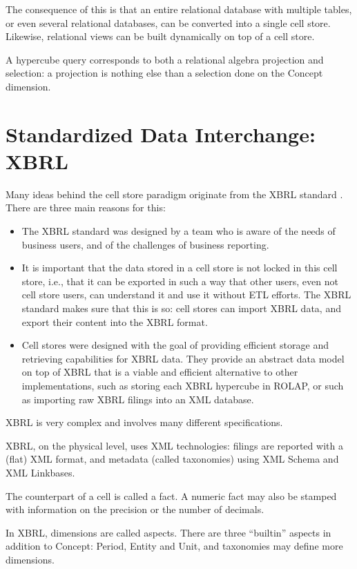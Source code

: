 \documentclass{vldb}
\begin{document}
The consequence of this is that an entire relational database with multiple tables, or even several relational databases, can be converted into a single cell store. Likewise, relational views can be built dynamically on top of a cell store.

A hypercube query corresponds to both a relational algebra projection and selection: a projection is nothing else than a selection done on the Concept dimension.

\section{Standardized Data Interchange: XBRL}
\label{section-xbrl-standard}
Many ideas behind the cell store paradigm originate from the XBRL standard \cite{XBRL}. There are three main reasons for this:

\begin{itemize}
\item The XBRL standard was designed by a team who is aware of the needs of business users, and of the challenges of business reporting.
\item It is important that the data stored in a cell store is not locked in this cell store, i.e., that it can be exported in such a way that other users, even not cell store users, can understand it and use it without ETL efforts. The XBRL standard makes sure that this is so: cell stores can import XBRL data, and export their content into the XBRL format.
\item Cell stores were designed with the goal of providing efficient storage and retrieving capabilities for XBRL data. They provide an abstract data model on top of XBRL that is a viable and efficient alternative to other implementations, such as storing each XBRL hypercube in ROLAP, or such as importing raw XBRL filings into an XML database.
\end{itemize}

XBRL is very complex and involves many different specifications.

XBRL, on the physical level, uses XML technologies: filings are reported with a (flat) XML format, and metadata (called taxonomies) using XML Schema and XML Linkbases.

The counterpart of a cell is called a fact. A numeric fact may also be stamped with information on the precision or the number of decimals.

In XBRL, dimensions are called aspects. There are three ``builtin'' aspects in addition to Concept: Period, Entity and Unit, and taxonomies may define more dimensions.
\end{document}
